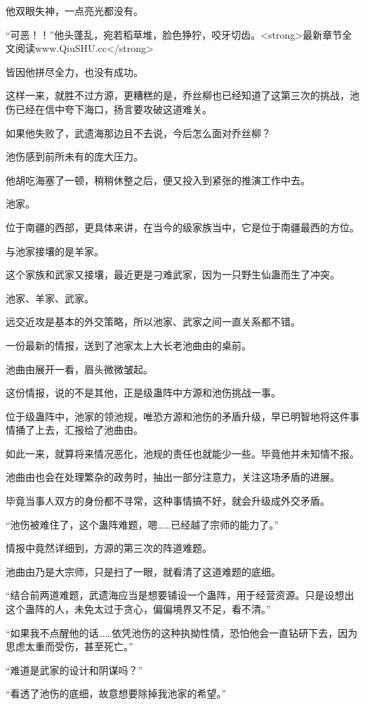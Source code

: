 \begin{this_body}
他双眼失神，一点亮光都没有。

“可恶！！”他头蓬乱，宛若稻草堆，脸色狰狞，咬牙切齿。<strong>最新章节全文阅读www.QiuSHU.cc</strong>

皆因他拼尽全力，也没有成功。

这样一来，就胜不过方源，更糟糕的是，乔丝柳也已经知道了这第三次的挑战，池伤已经在信中夸下海口，扬言要攻破这道难关。

如果他失败了，武遗海那边且不去说，今后怎么面对乔丝柳？

池伤感到前所未有的庞大压力。

他胡吃海塞了一顿，稍稍休整之后，便又投入到紧张的推演工作中去。

池家。

位于南疆的西部，更具体来讲，在当今的级家族当中，它是位于南疆最西的方位。

与池家接壤的是羊家。

这个家族和武家又接壤，最近更是刁难武家，因为一只野生仙蛊而生了冲突。

池家、羊家、武家。

远交近攻是基本的外交策略，所以池家、武家之间一直关系都不错。

一份最新的情报，送到了池家太上大长老池曲由的桌前。

池曲由展开一看，眉头微微皱起。

这份情报，说的不是其他，正是级蛊阵中方源和池伤挑战一事。

位于级蛊阵中，池家的领池规，唯恐方源和池伤的矛盾升级，早已明智地将这件事情捅了上去，汇报给了池曲由。

如此一来，就算将来情况恶化，池规的责任也就能少一些。毕竟他并未知情不报。

池曲由也会在处理繁杂的政务时，抽出一部分注意力，关注这场矛盾的进展。

毕竟当事人双方的身份都不寻常，这种事情搞不好，就会升级成外交矛盾。

“池伤被难住了，这个蛊阵难题，嗯……已经越了宗师的能力了。”

情报中竟然详细到，方源的第三次的阵道难题。

池曲由乃是大宗师，只是扫了一眼，就看清了这道难题的底细。

“结合前两道难题，武遗海应当是想要铺设一个蛊阵，用于经营资源。只是设想出这个蛊阵的人，未免太过于贪心，偏偏境界又不足，看不清。”

“如果我不点醒他的话……依凭池伤的这种执拗性情，恐怕他会一直钻研下去，因为思虑太重而受伤，甚至死亡。”

“难道是武家的设计和阴谋吗？”

“看透了池伤的底细，故意想要除掉我池家的希望。”


\end{this_body}

